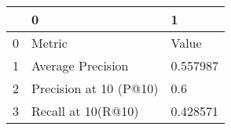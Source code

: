 \begin{tabular}{lll}
\toprule
{} &                       0 &         1 \\
\midrule
0 &                  Metric &     Value \\
1 &       Average Precision &  0.557987 \\
2 &  Precision at 10 (P@10) &       0.6 \\
3 &      Recall at 10(R@10) &  0.428571 \\
\bottomrule
\end{tabular}
